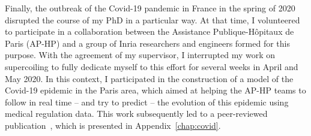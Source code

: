 Finally, the outbreak of the Covid-19 pandemic in France in the spring of 2020 disrupted the course of my PhD in a particular way.
At that time, I volunteered to participate in a collaboration between the Assistance Publique-Hôpitaux de Paris (AP-HP) and a group of Inria researchers and engineers formed for this purpose.
With the agreement of my supervisor, I interrupted my work on supercoiling to fully dedicate myself to this effort for several weeks in April and May 2020.
In this context, I participated in the construction of a model of the Covid-19 epidemic in the Paris area, which aimed at helping the AP-HP teams to follow in real time -- and try to predict -- the evolution of this epidemic using medical regulation data.
This work subsequently led to a peer-reviewed publication~\citep{gaubert2020}, which is presented in Appendix~\ref{chap:covid}.
